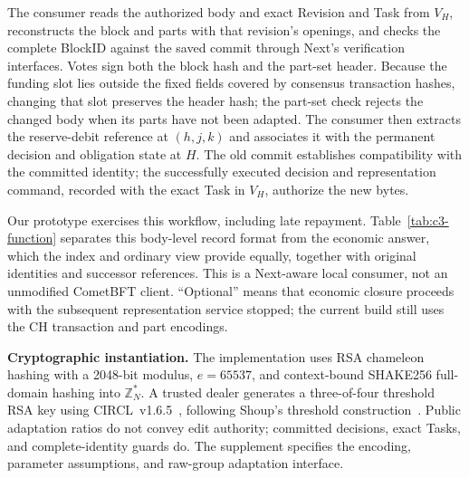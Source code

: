 The consumer reads the authorized body and exact Revision and Task from
$V_H$, reconstructs the block and parts with that revision's openings,
and checks the complete BlockID against the saved commit through Next's
verification interfaces. Votes sign both the block hash and the part-set
header. Because the funding slot lies outside the fixed fields covered by
consensus transaction hashes, changing that slot preserves the header
hash; the part-set check rejects the changed body when its parts have
not been adapted. The consumer then extracts the reserve-debit
reference at $(h,j,k)$ and associates it with the permanent decision and
obligation state at $H$. The old commit establishes compatibility with the committed identity;
the successfully executed decision and representation command, recorded
with the exact Task in $V_H$, authorize the new bytes.

Our prototype exercises this workflow, including late repayment.
Table~\ref{tab:c3-function} separates this body-level record format from the
economic answer, which the index and ordinary view provide equally,
together with original identities and successor references.
This is a Next-aware local consumer, not an unmodified CometBFT client.
``Optional'' means that economic closure proceeds with the subsequent
representation service stopped; the current build still uses the CH
transaction and part encodings.

\noindent\textbf{Cryptographic instantiation.}
The implementation uses RSA chameleon hashing with a 2048-bit modulus,
$e=65537$, and context-bound SHAKE256 full-domain hashing into
$\mathbb Z_N^*$. A trusted dealer generates a three-of-four threshold RSA
key using CIRCL~v1.6.5~\cite{circl}, following Shoup's threshold
construction~\cite{shoup}. Public adaptation ratios do not convey edit
authority; committed decisions, exact Tasks, and complete-identity guards
do. The supplement specifies the encoding, parameter assumptions, and
raw-group adaptation interface.
